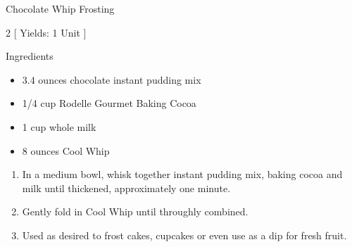 \begin{Large}
    Chocolate Whip Frosting
\end{Large}

\begin{scriptsize}
\begin{multicols}{2}
[
\vspace{1em}
Yields: 1 Unit
\vspace{-1.5em}
]

Ingredients
\begin{itemize}
    \item 3.4 ounces chocolate instant pudding mix
    \item 1/4 cup Rodelle Gourmet Baking Cocoa
    \item 1 cup whole milk
    \item 8 ounces Cool Whip
\end{itemize}
\end{multicols}
\end{scriptsize}

\begin{footnotesize}
\begin{enumerate}
    \item In a medium bowl, whisk together instant pudding mix, baking cocoa and milk until thickened, approximately one minute.
    \item Gently fold in Cool Whip until throughly combined.
    \item Used as desired to frost cakes, cupcakes or even use as a dip for fresh fruit.
\end{enumerate}
\end{footnotesize}

\vspace{2em}

